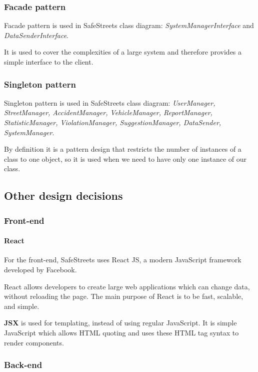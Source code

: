 \newpage

\subsubsection{Facade pattern}
Facade pattern is used in SafeStreets class diagram: \textit{SystemManagerInterface} and \textit{DataSenderInterface}.

It is used to cover the complexities of a large system and therefore provides a simple interface to the client. 


\subsubsection{Singleton pattern}
Singleton pattern is used in SafeStreets class diagram: \textit{UserManager, StreetManager, AccidentManager, VehicleManager, ReportManager, StatisticManager, ViolationManager, SuggestionManager, DataSender, SystemManager}.

By definition it is a pattern design that restricts the number of instances of a class to one object, so it is used when we need to have only one instance of our class.

\newpage 
\subsection{Other design decisions}

\subsubsection{Front-end}

\paragraph{React}

For the front-end, SafeStreets uses React JS, a modern JavaScript framework developed by Facebook.

React allows developers to create large web applications which can change data, without reloading the page. The main purpose of React is to be fast, scalable, and simple.

\textbf{JSX} is used for templating, instead of using regular JavaScript. It is simple JavaScript which allows HTML quoting and uses these HTML tag syntax to render components.

\subsubsection{Back-end}


